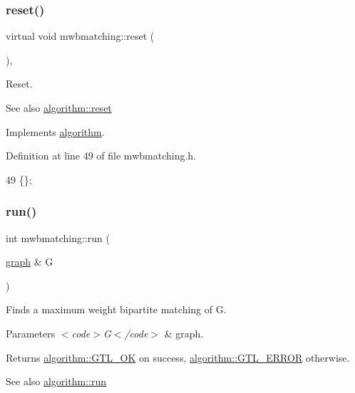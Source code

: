 \subsubsection{\texorpdfstring{reset()}{reset()}}
{\footnotesize\ttfamily virtual void mwbmatching\+::reset (\begin{DoxyParamCaption}{ }\end{DoxyParamCaption})\hspace{0.3cm}{\ttfamily [inline]}, {\ttfamily [virtual]}}

Reset.

\begin{DoxySeeAlso}{See also}
\mbox{\hyperlink{classalgorithm_a21aba63d066ae7897de6ca7d8425c408}{algorithm\+::reset}} 
\end{DoxySeeAlso}


Implements \mbox{\hyperlink{classalgorithm_a21aba63d066ae7897de6ca7d8425c408}{algorithm}}.



Definition at line 49 of file mwbmatching.\+h.


\begin{DoxyCode}
49 \{\};
\end{DoxyCode}
\mbox{\label{classmwbmatching_adcb51caed21e77253940cd71bfd9a405}} 
\subsubsection{\texorpdfstring{run()}{run()}}
{\footnotesize\ttfamily int mwbmatching\+::run (\begin{DoxyParamCaption}\item[{\mbox{\hyperlink{classgraph}{graph}} \&}]{G }\end{DoxyParamCaption})\hspace{0.3cm}{\ttfamily [virtual]}}

Finds a maximum weight bipartite matching of G.


\begin{DoxyParams}{Parameters}
{\em $<$code$>$\+G$<$/code$>$} & graph. \\
\hline
\end{DoxyParams}
\begin{DoxyReturn}{Returns}
{\ttfamily \mbox{\hyperlink{classalgorithm_af1a0078e153aa99c24f9bdf0d97f6710a5114c20e4a96a76b5de9f28bf15e282b}{algorithm\+::\+G\+T\+L\+\_\+\+OK}}} on success, {\ttfamily \mbox{\hyperlink{classalgorithm_af1a0078e153aa99c24f9bdf0d97f6710a6fcf574690bbd6cf710837a169510dd7}{algorithm\+::\+G\+T\+L\+\_\+\+E\+R\+R\+OR}}} otherwise. 
\end{DoxyReturn}
\begin{DoxySeeAlso}{See also}
\mbox{\hyperlink{classalgorithm_a734b189509a8d6b56b65f8ff772d43ca}{algorithm\+::run}} 
\end{DoxySeeAlso}


